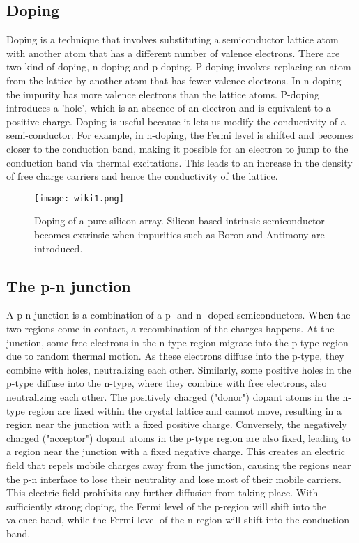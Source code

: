 \documentclass{article}
\begin{document}
\subsection{Doping}
Doping is a technique that involves substituting a semiconductor lattice atom with another atom that has a different number of valence electrons. There are two kind of doping, n-doping and p-doping. P-doping involves replacing an atom from the lattice by another atom that has fewer valence electrons. In n-doping the impurity has more valence electrons than the lattice atoms. P-doping introduces a 'hole', which is an absence of an electron and is equivalent to a positive charge. Doping is useful because it lets us modify the conductivity of a semi-conductor. For example, in n-doping, the Fermi level is shifted and becomes closer to the conduction band, making it possible for an electron to jump to the conduction band via thermal excitations. This leads to an increase in the density of free charge carriers and hence the conductivity of the lattice. 
\begin{figure}[H]
    \centering
    \texttt{[image: wiki1.png]}
    \caption{Doping of a pure silicon array. Silicon based intrinsic semiconductor becomes extrinsic when impurities such as Boron and Antimony are introduced. \cite{wikipediacontributors_2019_doping}}
    \label{fig:enter-label}
\end{figure}

\subsection{The p-n junction}
A p-n junction is a combination of a p- and n- doped semiconductors. When the two regions come in contact, a recombination of the charges happens. At the junction, some free electrons in the n-type region migrate into the p-type region due to random thermal motion. As these electrons diffuse into the p-type, they combine with holes, neutralizing each other. Similarly, some positive holes in the p-type diffuse into the n-type, where they combine with free electrons, also neutralizing each other. The positively charged ("donor") dopant atoms in the n-type region are fixed within the crystal lattice and cannot move, resulting in a region near the junction with a fixed positive charge. Conversely, the negatively charged ("acceptor") dopant atoms in the p-type region are also fixed, leading to a region near the junction with a fixed negative charge. This creates an electric field that repels mobile charges away from the junction, causing the regions near the p-n interface to lose their neutrality and lose most of their mobile carriers. This electric field prohibits any further diffusion from taking place. With sufficiently strong doping, the Fermi level of the p-region will shift into the valence band, while the Fermi level of the n-region will shift into the conduction band. 
\end{document}
